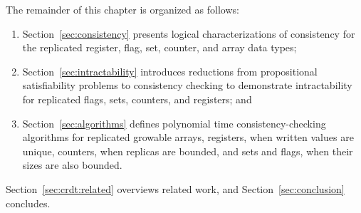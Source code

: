 The remainder of this chapter is organized as follows:
\begin{enumerate}

  \item Section~\ref{sec:consistency} presents logical characterizations of consistency for the replicated register, flag, set, counter, and array data types;

  \item Section~\ref{sec:intractability} introduces reductions from propositional satisfiability problems to consistency checking to demonstrate intractability for replicated flags, sets, counters, and registers; and

  \item Section~\ref{sec:algorithms} defines polynomial time consistency-checking algorithms for replicated growable arrays, registers, when written values are unique, counters, when replicas are bounded, and sets and flags, when their sizes are also bounded.

\end{enumerate}
Section~\ref{sec:crdt:related} overviews related work, and Section~\ref{sec:conclusion} concludes.
